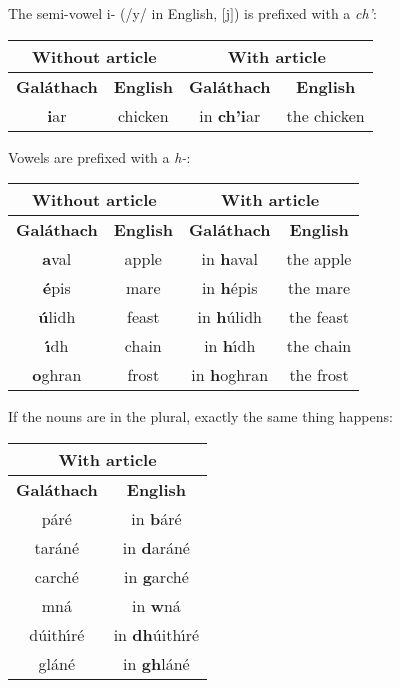 The semi-vowel i- (/y/ in English, $[$j$]$) is prefixed with a \textit{ch'}:
\begin{table}[H]
\centering
\begin{tabular}{cccc}
  \toprule
  \multicolumn{2}{c}{\textbf{Without article}} & \multicolumn{2}{c}{\textbf{With article}}\\
  \midrule
  \textbf{Gal\'{a}thach} & \textbf{English} & \textbf{Gal\'{a}thach} & \textbf{English}\\
  \cmidrule(lr){1-1}\cmidrule(lr){2-2}\cmidrule(lr){3-3}\cmidrule(lr){4-4}
  \textbf{i}ar & chicken & in \textbf{ch'i}ar & the chicken\\
  \bottomrule
\end{tabular}
\label{examples_article_semi_vowel_i}
\end{table}

Vowels are prefixed with a \textit{h-}:
\begin{table}[H]
\centering
\begin{tabular}{cccc}
  \toprule
  \multicolumn{2}{c}{\textbf{Without article}} & \multicolumn{2}{c}{\textbf{With article}}\\
  \midrule
  \textbf{Gal\'{a}thach} & \textbf{English} & \textbf{Gal\'{a}thach} & \textbf{English}\\
  \cmidrule(lr){1-1}\cmidrule(lr){2-2}\cmidrule(lr){3-3}\cmidrule(lr){4-4}
  \textbf{a}val & apple & in \textbf{h}aval & the apple\\
  \textbf{\'{e}}pis & mare & in \textbf{h}\'{e}pis & the mare\\
  \textbf{\'{u}}lidh & feast & in \textbf{h}\'{u}lidh & the feast\\
  \textbf{\'{\i}}dh & chain & in \textbf{h}\'{\i}dh & the chain\\
  \textbf{o}ghran & frost & in \textbf{h}oghran & the frost\\
  \bottomrule
\end{tabular}
\label{examples_article_prefix_h}
\end{table}

If the nouns are in the plural, exactly the same thing happens:
\begin{table}[H]
\centering
\begin{tabular}{cc}
  \toprule
  \multicolumn{2}{c}{\textbf{With article}}\\
  \midrule
  \textbf{Gal\'{a}thach} & \textbf{English}\\
  \cmidrule(lr){1-1}\cmidrule(lr){2-2}
  p\'{a}r\'{e} & in \textbf{b}\'{a}r\'{e}\\
  tar\'{a}n\'{e} & in \textbf{d}ar\'{a}n\'{e}\\
  carch\'{e} & in \textbf{g}arch\'{e}\\
  mn\'{a} & in \textbf{w}n\'{a}\\
  d\'{u}ith\'{\i}r\'{e} & in \textbf{dh}\'{u}ith\'{\i}r\'{e}\\
  gl\'{a}n\'{e} & in \textbf{gh}l\'{a}n\'{e}\\
  \bottomrule
\end{tabular}
\label{examples_fix_h}
\end{table}

